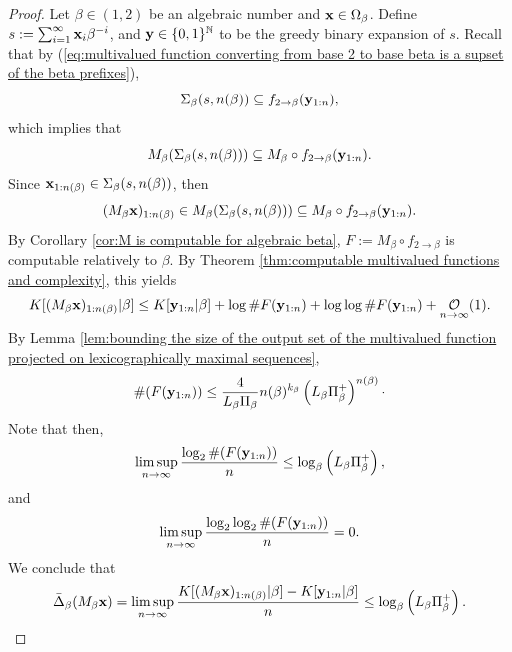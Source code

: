 \begin{proof}
    Let $\beta \in (1,2)$ be an algebraic number and ${\bf x} \in \Omega_\beta$. Define $s := \sum_{i=1}^\infty {\bf x}_i \beta^{-i}$, and ${\bf y} \in \{0,1\}^{\mathbb{N}}$ to be the greedy binary expansion of $s$. Recall that by (\ref{eq:multivalued function converting from base 2 to base beta is a supset of the beta prefixes}),
    \begin{equation}
        \Sigma_\beta(s,n(\beta)) \subseteq f_{2 \to \beta}({\bf y}_{1:n}),
    \end{equation}
    which implies that 
    \begin{equation}
        M_\beta(\Sigma_\beta(s,n(\beta))) \subseteq M_\beta\circ f_{2 \to \beta}({\bf y}_{1:n}).
    \end{equation}
    Since ${\bf x}_{1:n(\beta)} \in \Sigma_\beta(s,n(\beta))$, then 
    \begin{equation}
        (M_\beta{\bf x})_{1:n(\beta)} \in M_\beta(\Sigma_\beta(s,n(\beta))) \subseteq M_\beta\circ f_{2 \to \beta}({\bf y}_{1:n}).
    \end{equation}
    By Corollary \ref{cor:M is computable for algebraic beta}, $F := M_\beta \circ f_{2 \to \beta}$ is computable relatively to $\beta$. By Theorem \ref{thm:computable multivalued functions and complexity}, this yields
    \begin{align}
        K[(M_\beta\xf)_{1:\nlogbeta}|\beta]\leq K[\yf_{1:n}|\beta] + \log \# F(\yf_{1:n}) + \log\log \# F(\yf_{1:n}) + \bigOx[1]{n}.
    \end{align}
    By Lemma \ref{lem:bounding the size of the output set of the multivalued function projected on lexicographically maximal sequences}, 
    \begin{equation}
        \# (F({\bf y}_{1:n})) \leq \frac{4}{L_\beta\Pi_\beta}  n(\beta)^{k_\beta}\left(L_\beta \Pi_\beta^+ \right)^{n(\beta)}\cdot
    \end{equation}
    Note that then,
    \begin{equation}
        \limsup_{n \to \infty} \frac{\log_2\# (F({\bf y}_{1:n}))}{n} \leq \log_\beta\left(L_\beta \Pi_\beta^+\right),
    \end{equation}
    and 
    \begin{equation}
        \limsup_{n \to \infty} \frac{\log_2 \log_2\# (F({\bf y}_{1:n}))}{n} = 0.
    \end{equation}
    We conclude that
    \begin{equation}
        \bar\Delta_\beta(M_\beta{\bf x}) = \limsup_{n\to \infty} \frac{K[(M_\beta{\bf x})_{1:n(\beta)}|\beta] - K[{\bf y}_{1:n}|\beta]}{n} \leq \log_\beta\left(L_\beta \Pi_\beta^+\right).
    \end{equation}
\end{proof}
